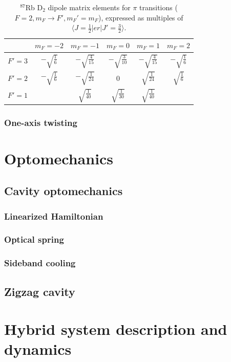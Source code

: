 \documentclass{article}
\numberwithin{equation}{section}
\begin{document}
\begin{table}[ht]
    \renewcommand{\arraystretch}{2}
    \centering
    \caption{$^{87}$Rb D$_2$ dipole matrix elements for $\pi$ transitions
    ($F=2,m_F\rightarrow F',m_F'=m_F$), expressed as multiples of
    $\langle J=\tfrac12 | er | J'=\tfrac32\rangle$.}
    \begin{tabular}{|c|c|c|c|c|c|}
        \hline
        & $m_F=-2$ & $m_F=-1$ & $m_F=0$ & $m_F=1$ & $m_F=2$ \\
        \hline
        $F'=3$
        & $-\sqrt{\frac{1}{6}}$
        & $-\sqrt{\frac{4}{15}}$
        & $-\sqrt{\frac{3}{10}}$
        & $-\sqrt{\frac{4}{15}}$
        & $-\sqrt{\frac{1}{6}}$ \\
        \hline
        $F'=2$
        & $-\sqrt{\frac{1}{6}}$
        & $-\sqrt{\frac{1}{24}}$
        & $0$
        & $\sqrt{\frac{1}{24}}$
        & $\sqrt{\frac{1}{6}}$ \\
        \hline
        $F'=1$
        & 
        & $\sqrt{\frac{1}{40}}$
        & $\sqrt{\frac{1}{30}}$
        & $\sqrt{\frac{1}{40}}$
        &  \\
        \hline
    \end{tabular}
    \label{tab:dipole_pi_F2}
\end{table}







\subsubsection{One-axis twisting}

\section{Optomechanics}

\subsection{Cavity optomechanics}

\subsubsection{Linearized Hamiltonian}

\subsubsection{Optical spring}

\subsubsection{Sideband cooling}

\subsection{Zigzag cavity}


\section{Hybrid system description and dynamics}


\printbibliography
\end{document}
